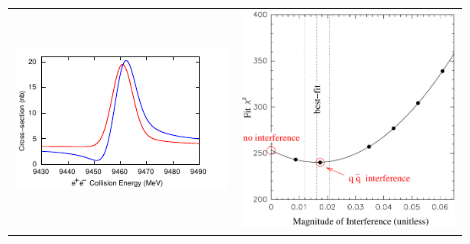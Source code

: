 \documentclass[landscape]{article}
\begin{document}
\begin{slide:interference}
\begin{center}
\begin{tabular}{p{0.45\linewidth} p{0.45\linewidth}}
\begin{minipage}{\linewidth}
\vspace{0.25 cm}
\includegraphics[width=\linewidth]{plots/interference}
\end{minipage} &
\begin{minipage}{\linewidth}
\includegraphics[width=\linewidth]{plots/simpleintfit}
\end{minipage}
\end{tabular}
\end{center}

\end{slide:interference}
\end{document}
